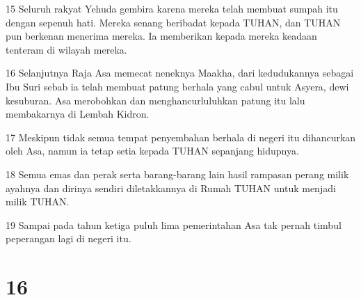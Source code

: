 \par 15 Seluruh rakyat Yehuda gembira karena mereka telah membuat sumpah itu dengan sepenuh hati. Mereka senang beribadat kepada TUHAN, dan TUHAN pun berkenan menerima mereka. Ia memberikan kepada mereka keadaan tenteram di wilayah mereka.
\par 16 Selanjutnya Raja Asa memecat neneknya Maakha, dari kedudukannya sebagai Ibu Suri sebab ia telah membuat patung berhala yang cabul untuk Asyera, dewi kesuburan. Asa merobohkan dan menghancurluluhkan patung itu lalu membakarnya di Lembah Kidron.
\par 17 Meskipun tidak semua tempat penyembahan berhala di negeri itu dihancurkan oleh Asa, namun ia tetap setia kepada TUHAN sepanjang hidupnya.
\par 18 Semua emas dan perak serta barang-barang lain hasil rampasan perang milik ayahnya dan dirinya sendiri diletakkannya di Rumah TUHAN untuk menjadi milik TUHAN.
\par 19 Sampai pada tahun ketiga puluh lima pemerintahan Asa tak pernah timbul peperangan lagi di negeri itu.

\chapter{16}

